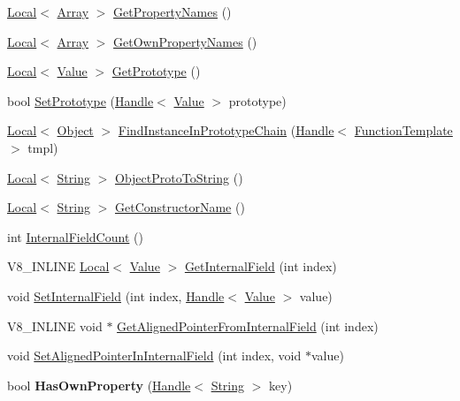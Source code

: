 \begin{DoxyCompactItemize}
\item 
\hyperlink{classv8_1_1Local}{Local}$<$ \hyperlink{classv8_1_1Array}{Array} $>$ \hyperlink{classv8_1_1Object_a9f45786246c6e6027b32f685d900a41f}{Get\+Property\+Names} ()
\item 
\hyperlink{classv8_1_1Local}{Local}$<$ \hyperlink{classv8_1_1Array}{Array} $>$ \hyperlink{classv8_1_1Object_aeb48075bdfb7b2b49fe08361a6c4d2a8}{Get\+Own\+Property\+Names} ()
\item 
\hyperlink{classv8_1_1Local}{Local}$<$ \hyperlink{classv8_1_1Value}{Value} $>$ \hyperlink{classv8_1_1Object_ae8d3fed7d6dbd667c29cabb3039fe7af}{Get\+Prototype} ()
\item 
bool \hyperlink{classv8_1_1Object_ab54bbd70d60e62d8bc22a8c8a6be593e}{Set\+Prototype} (\hyperlink{classv8_1_1Handle}{Handle}$<$ \hyperlink{classv8_1_1Value}{Value} $>$ prototype)
\item 
\hyperlink{classv8_1_1Local}{Local}$<$ \hyperlink{classv8_1_1Object}{Object} $>$ \hyperlink{classv8_1_1Object_ab2c5f7369abf08ae8f44dc84f5aa335a}{Find\+Instance\+In\+Prototype\+Chain} (\hyperlink{classv8_1_1Handle}{Handle}$<$ \hyperlink{classv8_1_1FunctionTemplate}{Function\+Template} $>$ tmpl)
\item 
\hyperlink{classv8_1_1Local}{Local}$<$ \hyperlink{classv8_1_1String}{String} $>$ \hyperlink{classv8_1_1Object_aeb2f524c806075e5f9032a24afd86869}{Object\+Proto\+To\+String} ()
\item 
\hyperlink{classv8_1_1Local}{Local}$<$ \hyperlink{classv8_1_1String}{String} $>$ \hyperlink{classv8_1_1Object_a7bbe987794658f20a3ec1b68326305e6}{Get\+Constructor\+Name} ()
\item 
int \hyperlink{classv8_1_1Object_aaec28576353eebe6fee113bce2718ecc}{Internal\+Field\+Count} ()
\item 
V8\+\_\+\+I\+N\+L\+I\+N\+E \hyperlink{classv8_1_1Local}{Local}$<$ \hyperlink{classv8_1_1Value}{Value} $>$ \hyperlink{classv8_1_1Object_aa3324fdf652d8ac3b2f27faa0559231d}{Get\+Internal\+Field} (int index)
\item 
void \hyperlink{classv8_1_1Object_a361b1781e7db29b17b063ef31315989e}{Set\+Internal\+Field} (int index, \hyperlink{classv8_1_1Handle}{Handle}$<$ \hyperlink{classv8_1_1Value}{Value} $>$ value)
\item 
V8\+\_\+\+I\+N\+L\+I\+N\+E void $\ast$ \hyperlink{classv8_1_1Object_a435f68bb7ef0f64dd522c5c910682448}{Get\+Aligned\+Pointer\+From\+Internal\+Field} (int index)
\item 
void \hyperlink{classv8_1_1Object_a0ccba69581f0b5e4e672bab90f26879b}{Set\+Aligned\+Pointer\+In\+Internal\+Field} (int index, void $\ast$value)
\item 
\hypertarget{classv8_1_1Object_a3ec4bcaa4e875987cc1845820a733777}{}bool {\bfseries Has\+Own\+Property} (\hyperlink{classv8_1_1Handle}{Handle}$<$ \hyperlink{classv8_1_1String}{String} $>$ key)\label{classv8_1_1Object_a3ec4bcaa4e875987cc1845820a733777}


\end{DoxyCompactItemize}
